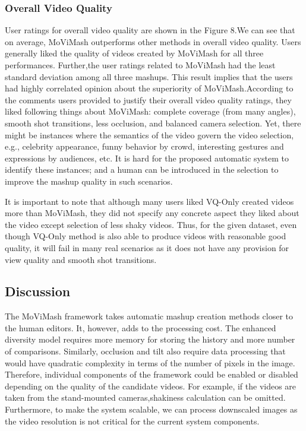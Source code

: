 \documentclass{sig-alternate}
\begin{document}
\subsubsection{Overall Video Quality}
User ratings for overall video quality are shown in the Figure 8.We can see that on average, MoViMash outperforms other methods in overall video quality. Users generally liked the quality of videos created by MoViMash for all three performances. Further,the user ratings related to MoViMash had the least standard deviation among all three mashups. This result implies that the users had highly correlated opinion about the superiority of MoViMash.According to the comments users provided to justify their overall video quality ratings, they liked following things about MoViMash: complete coverage (from many angles), smooth shot transitions, less occlusion, and balanced camera selection. Yet, there might be instances where the semantics of the video govern the video selection, e.g., celebrity appearance, funny behavior by crowd, interesting gestures and expressions by audiences, etc. It is hard for the proposed automatic system to identify these instances; and a human can be introduced in the selection to improve the mashup quality in such scenarios.

It is important to note that although many users liked VQ-Only created videos more than MoViMash, they did not specify any concrete aspect they liked about the video except selection of less shaky videos. Thus, for the given dataset, even though VQ-Only method is also able to produce videos with reasonable good quality, it will fail in many real scenarios as it does not have any provision for view quality and smooth shot transitions.

\subsection{Discussion}
The MoViMash framework takes automatic mashup creation methods closer to the human editors. It, however, adds to the processing cost. The enhanced diversity model requires more memory for storing the history and more number of comparisons. Similarly, occlusion and tilt also require data processing that would have quadratic complexity in terms of the number of pixels in the image. Therefore, individual components of the framework could be enabled or disabled depending on the quality of the candidate videos. For example, if the videos are taken from the stand-mounted cameras,shakiness calculation can be omitted. Furthermore, to make the system scalable, we can process downscaled images as the video resolution is not critical for the current system components.
\end{document}
